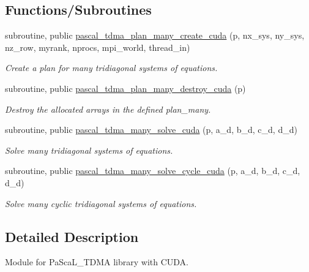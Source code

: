 \subsection*{Functions/\+Subroutines}
\textbf{ }\par
\begin{DoxyCompactItemize}
\item 
subroutine, public \hyperlink{namespacepascal__tdma__cuda_a84c442c238f7d1a18eef430aaa15e6c1}{pascal\+\_\+tdma\+\_\+plan\+\_\+many\+\_\+create\+\_\+cuda} (p, nx\+\_\+sys, ny\+\_\+sys, nz\+\_\+row, myrank, nprocs, mpi\+\_\+world, thread\+\_\+in)
\begin{DoxyCompactList}\small\item\em Create a plan for many tridiagonal systems of equations. \end{DoxyCompactList}\item 
subroutine, public \hyperlink{namespacepascal__tdma__cuda_a70734ba15cf5a093ac3ba2ccbc4f5330}{pascal\+\_\+tdma\+\_\+plan\+\_\+many\+\_\+destroy\+\_\+cuda} (p)
\begin{DoxyCompactList}\small\item\em Destroy the allocated arrays in the defined plan\+\_\+many. \end{DoxyCompactList}\item 
subroutine, public \hyperlink{namespacepascal__tdma__cuda_a0043d538e133925d9a37bf7bcdaf4b08}{pascal\+\_\+tdma\+\_\+many\+\_\+solve\+\_\+cuda} (p, a\+\_\+d, b\+\_\+d, c\+\_\+d, d\+\_\+d)
\begin{DoxyCompactList}\small\item\em Solve many tridiagonal systems of equations. \end{DoxyCompactList}\item 
subroutine, public \hyperlink{namespacepascal__tdma__cuda_afdd30998c4a8aecc093c823e3212b57a}{pascal\+\_\+tdma\+\_\+many\+\_\+solve\+\_\+cycle\+\_\+cuda} (p, a\+\_\+d, b\+\_\+d, c\+\_\+d, d\+\_\+d)
\begin{DoxyCompactList}\small\item\em Solve many cyclic tridiagonal systems of equations. \end{DoxyCompactList}\end{DoxyCompactItemize}



\subsection{Detailed Description}
Module for Pa\+Sca\+L\+\_\+\+T\+D\+MA library with C\+U\+DA. 

